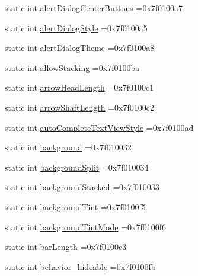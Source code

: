 \begin{DoxyCompactItemize}
static int \hyperlink{classandroid_1_1support_1_1v7_1_1cardview_1_1R_1_1attr_ae6d278326b134950f9bdf16085f24854}{alert\+Dialog\+Center\+Buttons} =0x7f0100a7
\item 
static int \hyperlink{classandroid_1_1support_1_1v7_1_1cardview_1_1R_1_1attr_a0d798a0d9dc93b5d065cce12a60d5a02}{alert\+Dialog\+Style} =0x7f0100a5
\item 
static int \hyperlink{classandroid_1_1support_1_1v7_1_1cardview_1_1R_1_1attr_a9c69f1c157431fd550f9dea2ab773ad5}{alert\+Dialog\+Theme} =0x7f0100a8
\item 
static int \hyperlink{classandroid_1_1support_1_1v7_1_1cardview_1_1R_1_1attr_a94a46df52b8cc0f96c6d082ef05258c3}{allow\+Stacking} =0x7f0100ba
\item 
static int \hyperlink{classandroid_1_1support_1_1v7_1_1cardview_1_1R_1_1attr_af325e0a81cb3c1eee00b490c7ae7b45d}{arrow\+Head\+Length} =0x7f0100c1
\item 
static int \hyperlink{classandroid_1_1support_1_1v7_1_1cardview_1_1R_1_1attr_a3926af148e58c48e553b14e8f44e2b7f}{arrow\+Shaft\+Length} =0x7f0100c2
\item 
static int \hyperlink{classandroid_1_1support_1_1v7_1_1cardview_1_1R_1_1attr_aa1e3d978cb321b0ef0b2e958b7c0c4b9}{auto\+Complete\+Text\+View\+Style} =0x7f0100ad
\item 
static int \hyperlink{classandroid_1_1support_1_1v7_1_1cardview_1_1R_1_1attr_a2c3c88c05e2e1f352d9729fda30281ac}{background} =0x7f010032
\item 
static int \hyperlink{classandroid_1_1support_1_1v7_1_1cardview_1_1R_1_1attr_afaa578ea45659f58ba2319e9ff85da78}{background\+Split} =0x7f010034
\item 
static int \hyperlink{classandroid_1_1support_1_1v7_1_1cardview_1_1R_1_1attr_a391ae99ec962c0c68e929d5171bf5468}{background\+Stacked} =0x7f010033
\item 
static int \hyperlink{classandroid_1_1support_1_1v7_1_1cardview_1_1R_1_1attr_ab937a9e918e0058bdb22175c79c80b62}{background\+Tint} =0x7f0100f5
\item 
static int \hyperlink{classandroid_1_1support_1_1v7_1_1cardview_1_1R_1_1attr_afb91022bf77beda3662ed71a44e449a0}{background\+Tint\+Mode} =0x7f0100f6
\item 
static int \hyperlink{classandroid_1_1support_1_1v7_1_1cardview_1_1R_1_1attr_a2ce9b99838a2d58ce2c820ccd5920e63}{bar\+Length} =0x7f0100c3
\item 
static int \hyperlink{classandroid_1_1support_1_1v7_1_1cardview_1_1R_1_1attr_a060d2bd5ef674ba58f9bdd768f7339db}{behavior\+\_\+hideable} =0x7f0100fb

\end{DoxyCompactItemize}
